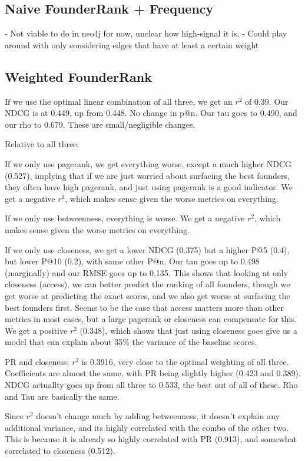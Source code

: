 \subsection{Naive FounderRank + Frequency}

- Not viable to do in neo4j for now, unclear how high-signal it is.
- Could play around with only considering edges that have at least a certain weight

\subsection{Weighted FounderRank}

If we use the optimal linear combination of all three, we get an $r^2$ of 0.39. Our NDCG is at 0.449, up from 0.448. No change in p@n. Our tau goes to 0.490, and our rho to 0.679. These are small/negligible changes.

Relative to all three:

If we only use pagerank, we get everything worse, except a much higher NDCG (0.527), implying that if we are just worried about surfacing the best founders, they often have high pagerank, and just using pagerank is a good indicator. We get a negative $r^2$, which makes sense given the worse metrics on everything.

If we only use betweenness, everything is worse. We get a negative $r^2$, which makes sense given the worse metrics on everything.

If we only use closeness, we get a lower NDCG (0.375) but a higher P@5 (0.4), but lower P@10 (0.2), with same other P@n. Our tau goes up to 0.498 (marginally) and our RMSE goes up to 0.135. This shows that looking at only closeness (access), we can better predict the ranking of all founders, though we get worse at predicting the exact scores, and we also get worse at surfacing the best founders first. Seems to be the case that access matters more than other metrics in most cases, but a large pagerank or closeness can compensate for this. We get a positive $r^2$ (0.348), which shows that just using closeness goes give us a model that can explain about 35\% the variance of the baseline scores.

PR and closeness: $r^2$ is 0.3916, very close to the optimal weighting of all three. Coefficients are almost the same, with PR being slightly higher (0.423 and 0.389). NDCG actuallty goes up from all three to 0.533, the best out of all of these. Rho and Tau are basically the same.

Since $r^2$ doesn't change much by adding betweenness, it doesn't explain any additional variance, and its highly correlated with the combo of the other two. This is because it is already so highly correlated with PR (0.913), and somewhat correlated to closeness (0.512).

